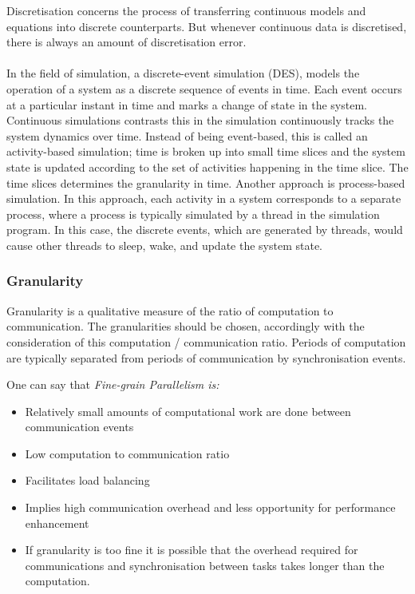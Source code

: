 Discretisation concerns the process of transferring continuous models and equations into discrete counterparts. But whenever continuous data is discretised, there is always an amount of discretisation error.
\\\\ %
In the field of simulation, a discrete-event simulation (DES), models the operation of a system as a discrete sequence of events in time. Each event occurs at a particular instant in time and marks a change of state in the system.
Continuous simulations contrasts this in the simulation continuously tracks the system dynamics over time. Instead of being event-based, this is called an activity-based simulation; time is broken up into small time slices and the system state is updated according to the set of activities happening in the time slice. The time slices determines the granularity in time.
Another approach is process-based simulation. In this approach, each activity in a system corresponds to a separate process, where a process is typically simulated by a thread in the simulation program. In this case, the discrete events, which are generated by threads, would cause other threads to sleep, wake, and update the system state.



\subsubsection{Granularity}
Granularity is a qualitative measure of the ratio of computation to communication. The granularities should be chosen, accordingly with the consideration of this computation / communication ratio. Periods of computation are typically separated from periods of communication by synchronisation events.

One can say that \emph{Fine-grain Parallelism is:}

\begin{itemize}
\item Relatively small amounts of computational work are done between communication events
\item Low computation to communication ratio
\item Facilitates load balancing
\item Implies high communication overhead and less opportunity for performance enhancement
\item If granularity is too fine it is possible that the overhead required for communications and synchronisation between tasks takes longer than the computation.
\end{itemize}

